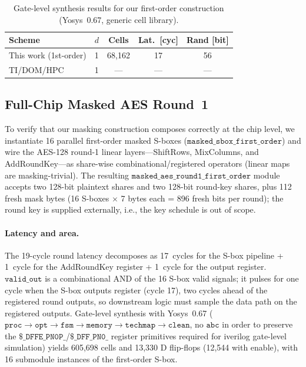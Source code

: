 \documentclass[lettersize,journal]{IEEEtran}
\begin{document}
\begin{table}[t]
\centering
\caption{Gate-level synthesis results for our first-order construction
(Yosys~0.67, generic cell library).}
\label{tab:cost}
\begin{tabular}{@{}lcccc@{}}
\toprule
Scheme & $d$ & Cells & Lat.\ [cyc] & Rand [bit] \\
\midrule
This work (1st-order)  & 1 &  68{,}162 & 17 &  56 \\
TI/DOM/HPC~\cite{nikova2006threshold,gross2016dom,cassiers2020hpc}
                     & 1 & --- & --- & --- \\
\bottomrule
\end{tabular}
\end{table}

\subsection{Full-Chip Masked AES Round~1}
\label{sec:fullchip}

To verify that our masking construction composes correctly at the
chip level, we instantiate 16 parallel first-order masked S-boxes
($\texttt{masked\_sbox\_first\_order}$) and wire the
AES-128 round-1 linear layers---ShiftRows, MixColumns, and
AddRoundKey---as share-wise combinational/registered operators
(linear maps are masking-trivial).  The resulting
$\texttt{masked\_aes\_round1\_first\_order}$ module accepts
two 128-bit plaintext shares and two 128-bit round-key shares,
plus 112 fresh mask bytes (16 S-boxes $\times$ 7 bytes each =
896 fresh bits per round); the round key is supplied externally,
i.e., the key schedule is out of scope.

\paragraph{Latency and area.}
The 19-cycle round latency decomposes as 17~cycles for the
S-box pipeline + 1~cycle for the AddRoundKey register +
1~cycle for the output register.  $\texttt{valid\_out}$ is a
combinational AND of the 16 S-box valid signals; it pulses for one
cycle when the S-box outputs register (cycle 17), two cycles ahead
of the registered round outputs, so downstream logic must sample
the data path on the registered outputs.  Gate-level
synthesis with Yosys~0.67 ($\texttt{proc} \to \texttt{opt}
\to \texttt{fsm} \to \texttt{memory} \to
\texttt{techmap} \to \texttt{clean}$, no $\texttt{abc}$ in order
to preserve the $\texttt{\$\_DFFE\_PN0P\_}$/$\texttt{\$\_DFF\_PN0\_}$
register primitives required for iverilog gate-level
simulation) yields 605{,}698 cells and 13{,}330 D flip-flops
(12{,}544 with enable), with
16 submodule instances of the first-order S-box.
\end{document}
